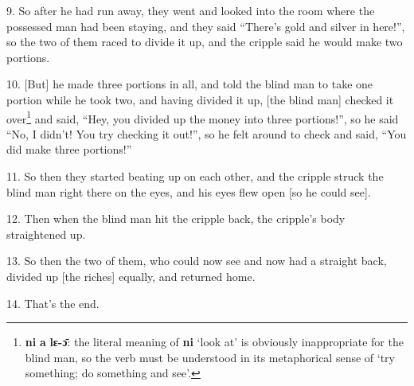 9. So after he had run away, they went and looked into the room where the possessed
man had been staying, and they said ``There's gold and silver in here!'', so the
two of them raced to divide it up, and the cripple said he would make two portions.

10. [But] he made three portions in all, and told the blind man to take one portion
while he took two, and having divided it up, [the blind man] checked it over\footnote{\textbf{ni} \textbf{a} \textbf{lɛ-ɔ̄}: the literal meaning of \textbf{ni} `look at' is obviously inappropriate for the blind man, so the verb must be understood in its metaphorical sense of `try something; do something and see'.}
and said, ``Hey, you divided up the money into three portions!'', so he said ``No,
I didn't! You try checking it out!'', so he felt around to check and said, ``You
did make three portions!''

11. So then they started beating up on each other, and the cripple struck the blind
man right there on the eyes, and his eyes flew open [so he could see].

12. Then when the blind man hit the cripple back, the cripple's body straightened
up.

13. So then the two of them, who could now see and now had a straight back, divided
up [the riches] equally, and returned home.

14. That's the end.

